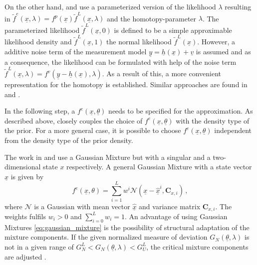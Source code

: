 \documentclass[a4paper]{IEEEtran}
\begin{document}
On the other hand, \cite{hanebeck2003b} and \cite{hanebeck2003} use a parameterized version of the likelihood $\lambda$ resulting in $\tilde{f}^{e}(\underline{x}, \lambda)=f^{p}(\underline{x})\tilde{f}^{L}(\underline{x}, \lambda)$ and the homotopy-parameter $\lambda$. 
The parameterized likelihood $\tilde{f}^{L}(\underline{x}, 0)$ is defined to be a simple approximable likelihood density and $\tilde{f}^{L}(\underline{x}, 1)$ the normal likelihood $\tilde{f}^{L}(\underline{x})$. However, a additive noise term of the measurement model $\underline{y}=\underline{h}(\underline{x}) + \underline{v}$ is assumed and as a consequence,
the likelihood can be formulated with help of the noise term $\tilde{f}^{L}(\underline{x}, \lambda) = f^{v}(\underline{y}-\underline{h}(\underline{x}), \lambda)$. As a result of this, a more convenient representation for the homotopy is established. Similar approaches are found in \cite{hanebeck2012a} and \cite{hanebeck}.

In the following step, a $f^e(\underline{x}, \underline{\theta})$ needs to be specified for the approximation. As described above, \cite{hagmar2011} closely couples the choice of $f^e(\underline{x}, \underline{\theta})$ with the density type of the prior.
For a more general case, it is possible to choose $f^e(\underline{x}, \underline{\theta})$ independent from the density type of the prior density. 

The work in \cite{hanebeck2003} and \cite{hanebeck2003b} use a Gaussian Mixture but with a singular and  a two-dimensional state $x$ respectively. A general Gaussian Mixture with a state vector $\underline{x}$ is given by
\begin{equation}
    f^{e}(\underline{x}, \theta) = \sum^{L}_{i=1} w^{i} \mathcal{N}(\underline{x}-\underline{\hat{x}}^{i}, \textbf{C}_{x, i}) \,,
    \label{eq:gaussian_mixture}
\end{equation}
where $\mathcal{N}$ is a Gaussian with mean vector $\underline{\hat{x}}$ and variance matrix $\textbf{C}_{x, i}$. The weights fulfils $w_{i} > 0$ and $\sum^{L}_{i=0} w_{i} = 1$.
An advantage of using Gaussian Mixtures \eqref{eq:gaussian_mixture} is the possibility of structural adaptation of the mixture components. If the given normalized measure of deviation $G_{N}(\underline{\theta}, \lambda)$ is not in a given range of $G^{L}_{N} < G_{N}(\underline{\theta}, \lambda) < G^{L}_{U}$, the critical mixture components are adjusted \cite{hanebeck2003}.
\end{document}
